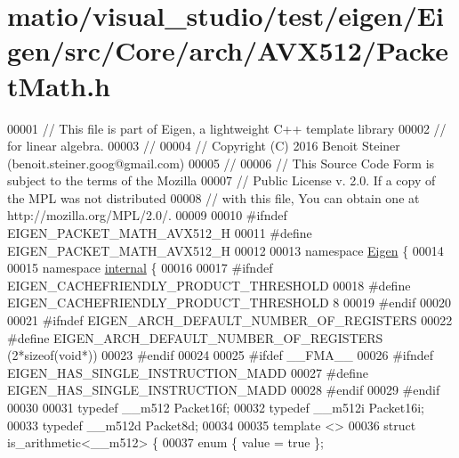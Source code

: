 \hypertarget{matio_2visual__studio_2test_2eigen_2_eigen_2src_2_core_2arch_2_a_v_x512_2_packet_math_8h_source}{}\section{matio/visual\+\_\+studio/test/eigen/\+Eigen/src/\+Core/arch/\+A\+V\+X512/\+Packet\+Math.h}
\label{matio_2visual__studio_2test_2eigen_2_eigen_2src_2_core_2arch_2_a_v_x512_2_packet_math_8h_source}

\begin{DoxyCode}
00001 \textcolor{comment}{// This file is part of Eigen, a lightweight C++ template library}
00002 \textcolor{comment}{// for linear algebra.}
00003 \textcolor{comment}{//}
00004 \textcolor{comment}{// Copyright (C) 2016 Benoit Steiner (benoit.steiner.goog@gmail.com)}
00005 \textcolor{comment}{//}
00006 \textcolor{comment}{// This Source Code Form is subject to the terms of the Mozilla}
00007 \textcolor{comment}{// Public License v. 2.0. If a copy of the MPL was not distributed}
00008 \textcolor{comment}{// with this file, You can obtain one at http://mozilla.org/MPL/2.0/.}
00009 
00010 \textcolor{preprocessor}{#ifndef EIGEN\_PACKET\_MATH\_AVX512\_H}
00011 \textcolor{preprocessor}{#define EIGEN\_PACKET\_MATH\_AVX512\_H}
00012 
00013 \textcolor{keyword}{namespace }\hyperlink{namespace_eigen}{Eigen} \{
00014 
00015 \textcolor{keyword}{namespace }\hyperlink{namespaceinternal}{internal} \{
00016 
00017 \textcolor{preprocessor}{#ifndef EIGEN\_CACHEFRIENDLY\_PRODUCT\_THRESHOLD}
00018 \textcolor{preprocessor}{#define EIGEN\_CACHEFRIENDLY\_PRODUCT\_THRESHOLD 8}
00019 \textcolor{preprocessor}{#endif}
00020 
00021 \textcolor{preprocessor}{#ifndef EIGEN\_ARCH\_DEFAULT\_NUMBER\_OF\_REGISTERS}
00022 \textcolor{preprocessor}{#define EIGEN\_ARCH\_DEFAULT\_NUMBER\_OF\_REGISTERS (2*sizeof(void*))}
00023 \textcolor{preprocessor}{#endif}
00024 
00025 \textcolor{preprocessor}{#ifdef \_\_FMA\_\_}
00026 \textcolor{preprocessor}{#ifndef EIGEN\_HAS\_SINGLE\_INSTRUCTION\_MADD}
00027 \textcolor{preprocessor}{#define EIGEN\_HAS\_SINGLE\_INSTRUCTION\_MADD}
00028 \textcolor{preprocessor}{#endif}
00029 \textcolor{preprocessor}{#endif}
00030 
00031 \textcolor{keyword}{typedef} \_\_m512 Packet16f;
00032 \textcolor{keyword}{typedef} \_\_m512i Packet16i;
00033 \textcolor{keyword}{typedef} \_\_m512d Packet8d;
00034 
00035 \textcolor{keyword}{template} <>
00036 \textcolor{keyword}{struct }is\_arithmetic<\_\_m512> \{
00037   \textcolor{keyword}{enum} \{ value = \textcolor{keyword}{true} \};

\end{DoxyCode}
